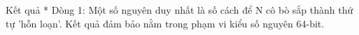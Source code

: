 Kết quả
* Dòng 1: Một số nguyên duy nhất là số cách để N cô bò sắp thành thứ tự 'hỗn loạn'. Kết quả đảm bảo nằm trong phạm vi kiểu số nguyên 64-bit.